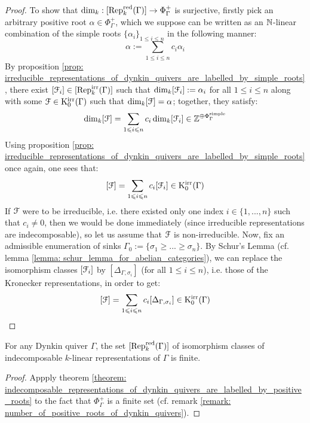 \begin{proof}
                    To show that $\dim_k: [\mathrm{Rep}_k^{\mathrm{red}}(\Gamma)] \to \Phi_{\Gamma}^+$ is surjective, firstly pick an arbitrary positive root $\alpha \in \Phi_{\Gamma}^+$, which we suppose can be written as an $\mathbb{N}$-linear combination of the simple roots $\{\alpha_i\}_{1 \leq i \leq n}$ in the following manner:
                        $$\alpha := \sum_{1 \leq i \leq n} c_i \alpha_i$$
                    By proposition \ref{prop: irreducible_representations_of_dynkin_quivers_are_labelled_by_simple_roots}, there exist $[\mathcal{F}_i] \in [\mathrm{Rep}_k^{\mathrm{irr}}(\Gamma)]$ such that $\dim_k [\mathcal{F}_i] := \alpha_i$ for all $1 \leq i \leq n$ along with some $\mathcal{F} \in \mathrm{K}_0^{\mathrm{irr}}(\Gamma)$ such that $\dim_k [\mathcal{F}] = \alpha$; together, they satisfy:
                        $$\dim_k [\mathcal{F}] = \sum_{1 \leqslant i \leqslant n} c_i \dim_k [\mathcal{F}_i] \in \mathbb{Z}^{\oplus \Phi_{\Gamma}^{\mathrm{simple}}}$$
                    Using proposition \ref{prop: irreducible_representations_of_dynkin_quivers_are_labelled_by_simple_roots} once again, one sees that:
                        $$[\mathcal{F}] = \sum_{1 \leqslant i \leqslant n} c_i [\mathcal{F}_i] \in \mathrm{K}_0^{\mathrm{irr}}(\Gamma)$$
                    If $\mathcal{F}$ were to be irreducible, i.e. there existed only one index $i \in \{1, ..., n\}$ such that $c_i \not = 0$, then we would be done immediately (since irreducible representations are indecomposable), so let us assume that $\mathcal{F}$ is non-irreducible. Now, fix an admissible enumeration of sinks $\Gamma_0 := \{\sigma_1 \geq ... \geq \sigma_n\}$. By Schur's Lemma (cf. lemma \ref{lemma: schur_lemma_for_abelian_categories}), we can replace the isomorphism classes $[\mathcal{F}_i]$ by $[\Delta_{\Gamma, \sigma_i}]$ (for all $1 \leq i \leq n$), i.e. those of the Kronecker representations, in order to get:
                        $$[\mathcal{F}] = \sum_{1 \leqslant i \leqslant n} c_i [\Delta_{\Gamma, \sigma_i}] \in \mathrm{K}_0^{\mathrm{irr}}(\Gamma)$$
                \end{proof}
            \begin{corollary} \label{coro: dynkin_quivers_are_representation_finite}
                For any Dynkin quiver $\Gamma$, the set $[\mathrm{Rep}_k^{\mathrm{red}}(\Gamma)]$ of isomorphism classes of indecomposable $k$-linear representations of $\Gamma$ is finite. 
            \end{corollary}
                \begin{proof}
                    Appply theorem \ref{theorem: indecomposable_representations_of_dynkin_quivers_are_labelled_by_positive_roots} to the fact that $\Phi_{\Gamma}^+$ is a finite set (cf. remark \ref{remark: number_of_positive_roots_of_dynkin_quivers}).
                \end{proof}
            
